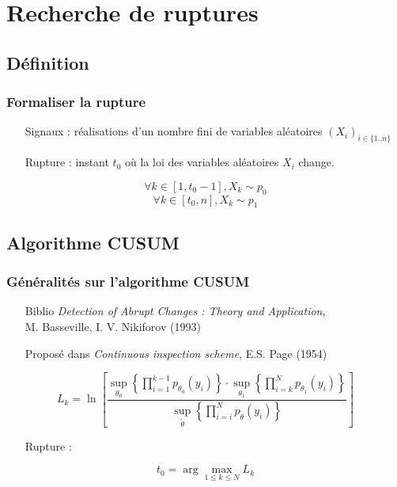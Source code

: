 \documentclass{beamer}
\begin{document}
\section{Recherche de ruptures}

\subsection{Définition}

\begin{frame}

\frametitle{Formaliser la rupture}

\begin{itemize}

	\item[Signaux]: réalisations d'un nombre fini de variables aléatoires $(X_i)_{i \in \{1..n\}}$
	
	\item[Rupture]: instant $t_0$ où la loi des variables aléatoires $X_i$ change.

\end{itemize}

\[
	\forall k \in [1, t_0-1], X_k \sim p_0
\]
\[
	\forall k \in [t_0, n], X_k \sim p_1
\]

\end{frame}

\subsection{Algorithme CUSUM}

\begin{frame}
	\frametitle{Généralités sur l'algorithme CUSUM}
	\begin{itemize}
		\item[Biblio] \emph{Detection of Abrupt Changes : Theory and Application},\\
		M. Basseville, I. V. Nikiforov (1993)
		\item[Proposé] dans \emph{Continuous inspection scheme}, E.S. Page (1954)
	\end{itemize}
	\begin{equation}
		L _k =\ln \left[ \frac{\sup_{\theta_0}\left\{ \prod_{i=1}^{k-1} p_{\theta_0}(y_i) \right\} \cdot \sup_{\theta_1} \left\{ \prod_{i = k}^{N}p_{\theta_1}(y_i) \right\}}{\sup_{\tilde\theta}\left\{\prod_{i=i}^{N}p_{\tilde{\theta}}(y_i)\right\}} \right]
	\end{equation}
	\begin{itemize}
		\item[Rupture]:
	\end{itemize}
	\begin{equation}
		t_0 = \arg \max_{1 \leq k \leq N} L_k
	\end{equation}
\end{frame}
\end{document}
